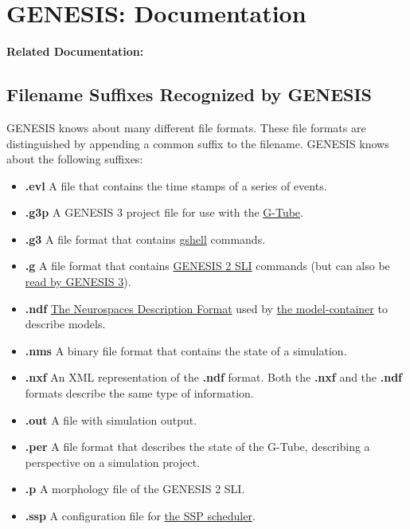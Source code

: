 \documentclass[12pt]{article}
\begin{document}
\section*{GENESIS: Documentation}

{\bf Related Documentation:}

\subsection*{Filename Suffixes Recognized by GENESIS}

GENESIS knows about many different file formats.  These file formats
are distinguished by appending a common suffix to the
filename.  GENESIS knows about the following suffixes:

\begin{itemize}

\item[]{\bf .evl} A file that contains the time stamps of a series of
  events.
\item[]{\bf .g3p} A GENESIS 3 project file for use with the
  \href{../gtube/gtube.tex}{G-Tube}.
\item[]{\bf .g3} A file format that contains
  \href{../gshell/gshell.tex}{gshell} commands.
\item[]{\bf .g} A file format that contains
  \href{http://genesis-sim.org/GENESIS/}{GENESIS 2 SLI} commands (but
  can also be
  \href{../backward-compatibility/backward-compatibility.tex}{read by
    GENESIS 3}).
\item[]{\bf .ndf} \href{../ndf-file-format/ndf-file-format.tex}{The
    Neurospaces Description Format} used by
  \href{../model-container/model-container.tex}{the model-container}
  to describe models.
\item[]{\bf .nms} A binary file format that contains the state of a
  simulation.
\item[]{\bf .nxf} An XML representation of the {\bf .ndf} format.
  Both the {\bf .nxf} and the {\bf .ndf} formats describe the same
  type of information.
\item[]{\bf .out} A file with simulation output.
\item[]{\bf .per} A file format that describes the state of the
  G-Tube, describing a perspective on a simulation project.
\item[]{\bf .p} A morphology file of the GENESIS 2 SLI.
\item[]{\bf .ssp} A configuration file for \href{../ssp/ssp.tex}{the
    SSP scheduler}.

\end{itemize}
\end{document}
